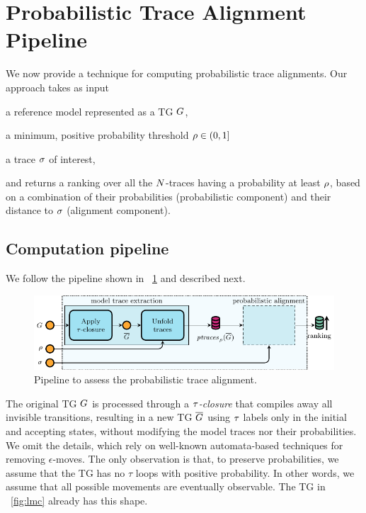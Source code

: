 
\section{Probabilistic Trace Alignment Pipeline}
We now provide a technique for computing probabilistic trace alignments. Our approach takes as input
\begin{inparaenum}[\it (i)]
\item a reference model represented as a TG $G$,
\item a minimum, positive probability threshold $\rho \in (0,1]$
\item a trace $\sigma$ of interest,
\end{inparaenum}
and returns a ranking over all the $N$-traces having a probability at least $\rho$, based on a combination of their probabilities
(probabilistic component) and their distance to $\sigma$ (alignment component).


\subsection{Computation pipeline}
We follow the pipeline shown in \figurename~\ref{fig:pipe} and described next.
%
\begin{figure}[!t]
	\includegraphics[width=\columnwidth]{images/pipelineShort}
	\caption{Pipeline to assess the probabilistic trace alignment.}\label{fig:pipe}
\end{figure}
%
%
%
The original TG $G$ is processed through a \emph{$\tau$-closure} that compiles away all invisible transitions, resulting in
a new TG $\overline{G}$ using $\tau$ labels only in the initial and accepting states, without modifying the
model traces nor their probabilities. We omit the details, which rely on well-known automata-based techniques for removing
$\epsilon$-moves. The only observation is that, to preserve probabilities, we assume that the TG has no $\tau$ loops with
positive probability. In other words, we assume that all possible movements are eventually observable.
The TG in \figurename~\ref{fig:lmc} already has this shape.

